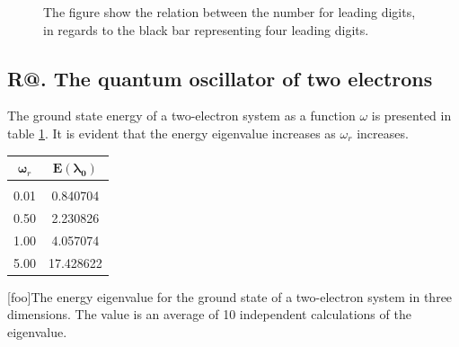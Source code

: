 \documentclass[%
reprint,
amsmath, 
amssymb, 
aps,]{revtex4-1}
\makeatletter
\newcommand*{\rom}[1]{\expandafter\@slowromancap\romannumeral #1@}
\makeatother
\begin{document}
			\begin{figure}[!h]
\noindent{}
\caption{The figure show the relation between the number for leading digits, in regards to the black bar representing four leading digits.} \label{fig:RE}
			\end{figure}
 
		\subsection*{R\rom{3}. The quantum oscillator of two electrons} \noindent 
The ground state energy of a two-electron system as a function $\omega$ is presented in table \ref{tab2}. It is evident that the energy eigenvalue increases as $\omega_r$ increases. 

			\begin{table}[H]
\centering 
				\begin{tabular} {|c|c|}
\hline
$\mathbf{\omega}_r$ & $\mathbf{E(\lambda_0)}$\\ 
\hline
 & \\ 
0.01 &  0.840704 \\
0.50 &  2.230826\\
1.00 &  4.057074\\
5.00 &  17.428622\\ 
\hline 
				\end{tabular}
[foo]{The energy eigenvalue for the ground state of a two-electron system in three dimensions. The value is an average of 10 independent calculations of the eigenvalue.\label{tab2}}
			\end{table}
\end{document}
